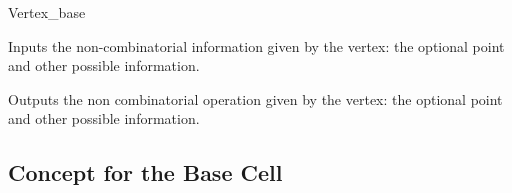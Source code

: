 \begin{ccClass}{Vertex_base}

{Inputs the non-combinatorial information given by the vertex: 
the optional point and other possible information.}

{Outputs the non combinatorial operation given by the vertex: the
optional point and other possible information.}

	\end{ccClass}

	\subsection{Concept for the Base Cell }


